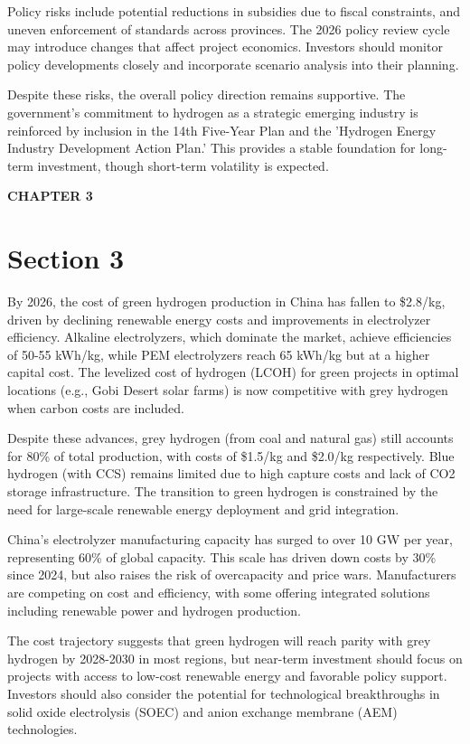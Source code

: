 \documentclass[10.5pt,a4paper]{article}
\newcommand{\kicker}[1]{\textcolor{BOBlue}{\scriptsize\bfseries\MakeUppercase{#1}}\\[-2pt]}
\begin{document}
{\small Policy risks include potential reductions in subsidies due to fiscal constraints, and uneven enforcement of standards across provinces. The 2026 policy review cycle may introduce changes that affect project economics. Investors should monitor policy developments closely and incorporate scenario analysis into their planning.}

{\small Despite these risks, the overall policy direction remains supportive. The government's commitment to hydrogen as a strategic emerging industry is reinforced by inclusion in the 14th Five-Year Plan and the 'Hydrogen Energy Industry Development Action Plan.' This provides a stable foundation for long-term investment, though short-term volatility is expected.}




\Needspace{55mm}
\kicker{Chapter 3}
\section*{Section 3}

{\small By 2026, the cost of green hydrogen production in China has fallen to \$2.8/kg, driven by declining renewable energy costs and improvements in electrolyzer efficiency. Alkaline electrolyzers, which dominate the market, achieve efficiencies of 50-55 kWh/kg, while PEM electrolyzers reach 65 kWh/kg but at a higher capital cost. The levelized cost of hydrogen (LCOH) for green projects in optimal locations (e.g., Gobi Desert solar farms) is now competitive with grey hydrogen when carbon costs are included.}

{\small Despite these advances, grey hydrogen (from coal and natural gas) still accounts for 80\% of total production, with costs of \$1.5/kg and \$2.0/kg respectively. Blue hydrogen (with CCS) remains limited due to high capture costs and lack of CO2 storage infrastructure. The transition to green hydrogen is constrained by the need for large-scale renewable energy deployment and grid integration.}

{\small China's electrolyzer manufacturing capacity has surged to over 10 GW per year, representing 60\% of global capacity. This scale has driven down costs by 30\% since 2024, but also raises the risk of overcapacity and price wars. Manufacturers are competing on cost and efficiency, with some offering integrated solutions including renewable power and hydrogen production.}

{\small The cost trajectory suggests that green hydrogen will reach parity with grey hydrogen by 2028-2030 in most regions, but near-term investment should focus on projects with access to low-cost renewable energy and favorable policy support. Investors should also consider the potential for technological breakthroughs in solid oxide electrolysis (SOEC) and anion exchange membrane (AEM) technologies.}
\end{document}
